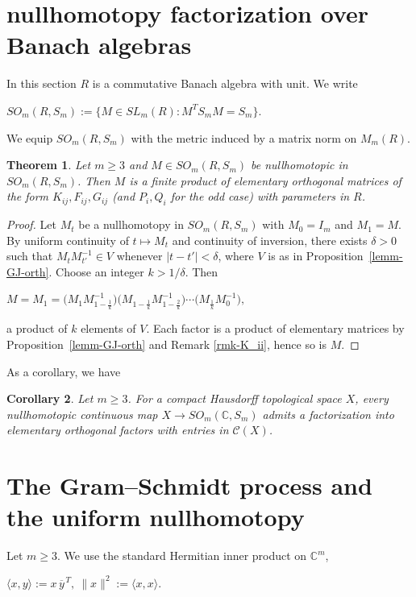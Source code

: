 \documentclass[11pt]{amsart}
\newtheorem{theorem}{Theorem}[section]
\newtheorem{corollary}[theorem]{Corollary}
\theoremstyle{definition}
\theoremstyle{remark}
\theoremstyle{remark}
\begin{document}
\section{nullhomotopy factorization over Banach algebras} \label{sec-Banach}

In this section $R$ is a commutative Banach algebra with unit.
We write
\begin{center}
$SO_{m}(R,S_m):=\{M\in SL_{m}(R): M^T S_m M=S_m \}.$
\end{center}
We equip $SO_{m}(R,S_m)$ with the metric induced by a matrix norm on $M_{m}(R)$.

\begin{theorem}
\label{thm-main}
Let $m \geq 3$ and $M\in SO_{m}(R,S_m)$ be nullhomotopic
in $SO_{m}(R,S_m)$. Then $M$ is a finite product of elementary orthogonal matrices of the form
$K_{ij},F_{ij},G_{ij}$ (and $P_i, Q_i$ for the odd case) with parameters in $R$.
\end{theorem}
\begin{proof}%
Let $M_t$ be a nullhomotopy in $SO_{m}(R,S_m)$ with $M_0=I_m$ and $M_1=M$.
By uniform continuity of $t\mapsto M_t$ and continuity of inversion, there exists $\delta>0$ such that
$M_tM_{t'}^{-1}\in V$ whenever $|t-t'|<\delta$, where $V$ is as in Proposition~\ref{lemm-GJ-orth}.
Choose an integer $k>1/\delta$. Then
\begin{center}
$M=M_1=\bigl(M_1M_{1-\frac1k}^{-1}\bigr)\bigl(M_{1-\frac1k}M_{1-\frac2k}^{-1}\bigr)\cdots
\bigl(M_{\frac1k}M_0^{-1}\bigr),$
\end{center}
a product of $k$ elements of $V$. Each factor is a product of elementary matrices by Proposition~\ref{lemm-GJ-orth} and Remark \ref{rmk-K_ii},
hence so is $M$.
\end{proof}


As a corollary, we have 
\begin{corollary}

Let $m \ge 3$. For a compact  Hausdorff topological space $X$, every nullhomotopic continuous map
$X\to SO_{m}(\mathbb{C}, S_m)$  admits
a factorization into elementary orthogonal factors with entries in $\mathcal{C}(X)$.
\end{corollary}




\section{The Gram--Schmidt process and the uniform nullhomotopy} \label{sec-GS}
Let $m \ge 3$. We use the standard Hermitian inner product on $\mathbb C^{m}$,
\begin{center}
$\langle x,y\rangle := x\,\overline{y}^{\,T},\ \|x\|^2 := \langle x,x\rangle.$
\end{center}
\end{document}
